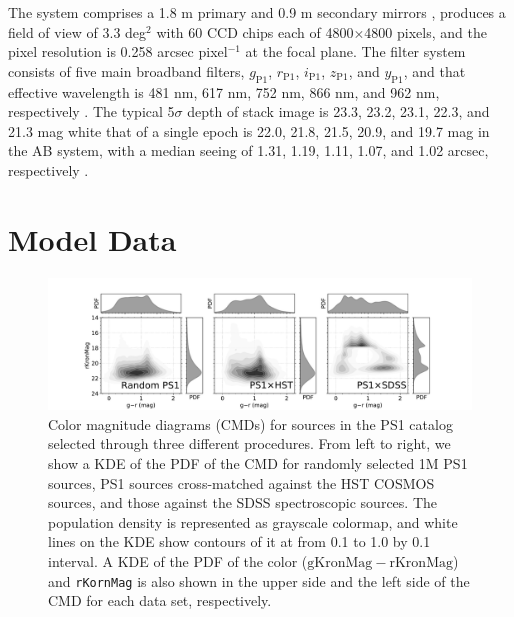 \documentclass[twocolumn]{aastex62}
\begin{document}
The system comprises a 1.8 m primary and 0.9 m secondary mirrors \citep{Hodapp04}, 
produces a field of view of 3.3 deg$^2$ with 60 CCD chips each of 4800$\times$4800 pixels, 
and the pixel resolution is 0.258 arcsec pixel$^{-1}$ at the focal plane. 
The filter system consists of five main broadband filters, 
$g_{\mathrm{P1}}$, $r_{\mathrm{P1}}$, $i_{\mathrm{P1}}$, $z_{\mathrm{P1}}$, and $y_{\mathrm{P1}}$, 
and that effective wavelength is 481 nm, 617 nm, 752 nm, 866 nm, and 962 nm, 
respectively \citep{Tonry12, Schlafly12}. 
The typical 5$\sigma$ depth of stack image is 23.3, 23.2, 23.1, 22.3, and 21.3 mag 
white that of a single epoch is 22.0, 21.8, 21.5, 20.9, and 19.7 mag in the AB system, 
with a median seeing of 1.31, 1.19, 1.11, 1.07, and 1.02 arcsec, respectively \citep{Chambers16}. 
\fi


\section{Model Data}\label{sec:model_data}
\begin{figure}[t]
 \centering
  \includegraphics[width=7in, bb = 79 3 1061 333]{./Figures/ColorMagDiagramComb.pdf}
  \caption{
  Color magnitude diagrams (CMDs) for sources in the PS1 catalog selected through three different procedures. 
  From left to right, we show a KDE of the PDF of the CMD for randomly selected 1M PS1 sources, 
  PS1 sources cross-matched against the HST COSMOS sources, 
  and those against the SDSS spectroscopic sources. 
  The population density is represented as grayscale colormap, 
  and white lines on the KDE show contours of it at from 0.1 to 1.0 by 0.1 interval. 
  A KDE of the PDF of the color ($\mathrm{gKronMag} - \mathrm{rKronMag}$) and \texttt{rKornMag} 
  is also shown in the upper side and the left side of the CMD for each data set, respectively. 
  }
  \label{fig:cmd}
\end{figure}
\end{document}
